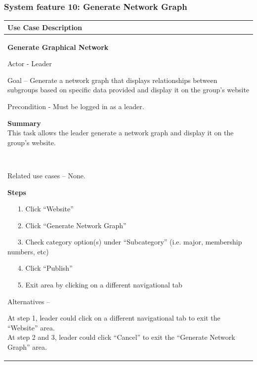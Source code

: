 \documentclass[letterpaper]{article}
\newcommand\textstyleDefaultParagraphFont[1]{#1}
\begin{document}
\bigskip

\subsubsection[System feature 10: Generate Network Graph]{\rmfamily
System feature 10: Generate Network Graph}
\begin{flushleft}
\tablehead{}
\begin{supertabular}{|m{6.42126in}|}
\hline
\bfseries\color{black} Use Case Description\\\hline
{\bfseries\color{black} Generate Graphical Network}

{\color{black} Actor - Leader}

{\color{black} Goal -- Generate a network graph that displays
relationships between subgroups based on specific data provided and
display it on the group{\textquoteright}s website}

{\color{black} Precondition - Must be logged in as a leader.}

{\color{black} \textstyleDefaultParagraphFont{\textbf{Summary}}\newline
\textstyleDefaultParagraphFont{This task allows the leader
}\textstyleDefaultParagraphFont{generate a network graph and display it
on the
group}\textstyleDefaultParagraphFont{{\textquoteright}}\textstyleDefaultParagraphFont{s
website.}}

~

{\color{black} Related use cases -- None.}

{\color{black} \textstyleDefaultParagraphFont{\textbf{Steps}}}

{\color{black} \ \ \ 1. Click
{\textquotedblleft}Website{\textquotedblright} }

{\color{black} \ \ \ 2. Click {\textquotedblleft}Generate Network
Graph{\textquotedblright} }

{\color{black} \ \ \ 3. Check category option(s) under
{\textquotedblleft}Subcategory{\textquotedblright} (i.e. major,
membership numbers, etc)}

{\color{black} \ \ \ 4. Click
{\textquotedblleft}Publish{\textquotedblright}}

{\color{black} \ \ \ 5. Exit area by clicking on a different
navigational tab}

{\color{black} Alternatives -- }

{\color{black} At step 1, leader could click on a different navigational
tab to exit the {\textquotedblleft}Website{\textquotedblright}
area.\newline
At step 2 and 3, leader could click
{\textquotedblleft}Cancel{\textquotedblright} to exit the
{\textquotedblleft}Generate Network Graph{\textquotedblright} area.}


\end{supertabular}
\end{flushleft}
\end{document}
